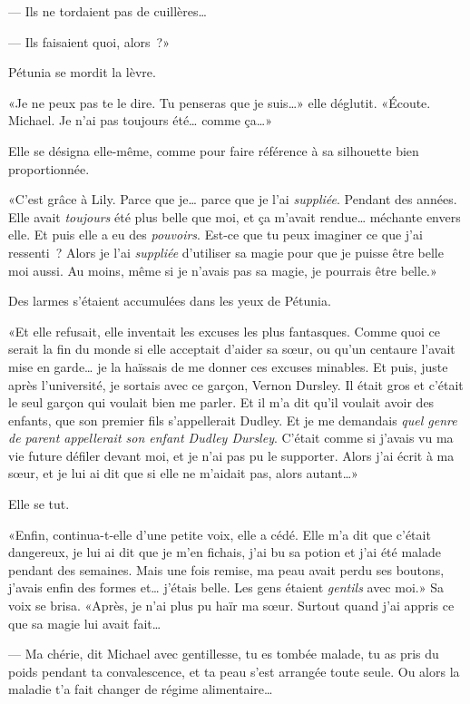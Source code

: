 --- Ils ne tordaient pas de cuillères…

--- Ils faisaient quoi, alors~?»

Pétunia se mordit la lèvre.

«Je ne peux pas te le dire. Tu penseras que je suis…» elle déglutit. «Écoute. Michael. Je n'ai pas toujours été… comme ça…»

Elle se désigna elle-même, comme pour faire référence à sa silhouette bien proportionnée.

«C'est grâce à Lily. Parce que je… parce que je l'ai \emph{suppliée}. Pendant des années. Elle avait \emph{toujours} été plus belle que moi, et ça m'avait rendue… méchante envers elle. Et puis elle a eu des \emph{pouvoirs}. Est-ce que tu peux imaginer ce que j'ai ressenti~? Alors je l'ai \emph{suppliée} d'utiliser sa magie pour que je puisse être belle moi aussi. Au moins, même si je n'avais pas sa magie, je pourrais être belle.»

Des larmes s'étaient accumulées dans les yeux de Pétunia.

«Et elle refusait, elle inventait les excuses les plus fantasques. Comme quoi ce serait la fin du monde si elle acceptait d'aider sa sœur, ou qu'un centaure l'avait mise en garde… je la haïssais de me donner ces excuses minables. Et puis, juste après l'université, je sortais avec ce garçon, Vernon Dursley. Il était gros et c'était le seul garçon qui voulait bien me parler. Et il m'a dit qu'il voulait avoir des enfants, que son premier fils s'appellerait Dudley. Et je me demandais \emph{quel genre de parent appellerait son enfant Dudley Dursley}. C'était comme si j'avais vu ma vie future défiler devant moi, et je n'ai pas pu le supporter. Alors j'ai écrit à ma sœur, et je lui ai dit que si elle ne m'aidait pas, alors autant…»

Elle se tut.

«Enfin, continua-t-elle d'une petite voix, elle a cédé. Elle m'a dit que c'était dangereux, je lui ai dit que je m'en fichais, j'ai bu sa potion et j'ai été malade pendant des semaines. Mais une fois remise, ma peau avait perdu ses boutons, j'avais enfin des formes et… j'étais belle. Les gens étaient \emph{gentils} avec moi.» Sa voix se brisa. «Après, je n'ai plus pu haïr ma sœur. Surtout quand j'ai appris ce que sa magie lui avait fait…

--- Ma chérie, dit Michael avec gentillesse, tu es tombée malade, tu as pris du poids pendant ta convalescence, et ta peau s'est arrangée toute seule. Ou alors la maladie t'a fait changer de régime alimentaire…


